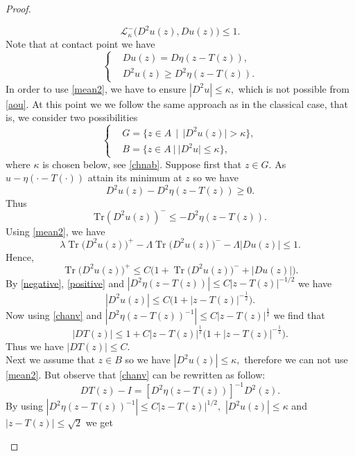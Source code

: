 \documentclass{amsart}
\theoremstyle{plain}
\numberwithin{equation}{section}
\begin{document}
\begin{proof}
\begin{enumerate}
\begin{equation}\label{mean2}
 \mathcal{L}_{\kappa}^{-}\big(D^{2}u(z),Du(z)\big)\leq 1. 
\end{equation}
Note that at contact point we have
\begin{equation}\label{aou}
\left\{
\begin{aligned}
&Du(z)=D\eta(z-T(z)),\\
&D^{2}u(z)\geq D^{2}\eta(z-T(z)).
\end{aligned}
\right.
\end{equation}
In order to use \eqref{mean2}, we have to ensure $|D^{2}u|\leq \kappa,$ which is not possible from \eqref{aou}. At this point we we follow the same approach as in the classical case, that is, we consider two possibilities 
\[
\left\{
\begin{aligned}
&G=\{z\in A~~|~~|D^{2}u(z)|>\kappa\},\\
&B=\{z\in A~|~|D^{2}u|\leq \kappa\},
\end{aligned}
\right.
\]
where $\kappa$ is chosen below, see \eqref{chnab}.  Suppose first that $z\in G.$ As $u-\eta(\cdot-T(\cdot))$ attain its minimum at $z$ so we have 
\[D^{2}u(z)-D^{2}\eta(z-T(z))\ge0.\]
Thus 
\begin{equation}\label{negative}
 \text{Tr}(D^{2}u(z))^{-}\leq -D^{2}\eta(z-T(z)).   
\end{equation}
Using \eqref{mean2}, we have 
\[\lambda\operatorname{Tr}\bigl(D^{2}u(z)\bigr)^{+}-\Lambda\operatorname{Tr}\bigl(D^{2}u(z)\bigr)^{-}-\Lambda|Du(z)|\le1.\]
Hence,
\begin{equation}\label{positive}
\operatorname{Tr}\bigl(D^{2}u(z)\bigr)^{+}\leq C\big(1+\operatorname{Tr}\bigl(D^{2}u(z)\bigr)^{-}+|Du(z)|\big).  \end{equation}
By \eqref{negative}, \eqref{positive} and $|D^{2}\eta(z-T(z))|\leq C|z-T(z)|^{-1/2}$ we have 
\begin{equation*}
|D^{2}u(z)|\leq C\big(1+|z-T(z)|^{-\frac{1}{2}}\big).
\end{equation*}
Now using \eqref{chanv} and $|D^{2}\eta(z-T(z))^{-1}|\leq C|z-T(z)|^{\frac{1}{2}}$ we find that 
\[|DT(z)|\leq 1+C|z-T(z)|^{\frac{1}{2}}\big(1+|z-T(z)|^{-\frac{1}{2}}\big).\]
Thus we have $|DT(z)|\leq C.$\\
Next we assume that $z\in B$ so we have $|D^{2}u(z)|\leq\kappa,$ therefore we can not use \eqref{mean2}. But observe that \eqref{chanv} can be rewritten as follow:
\[DT(z)-I=[D^{2}\eta(z-T(z))]^{-1}D^{2}(z).\]
By using $|D^{2}\eta(z-T(z))^{-1}|\leq C|z-T(z)|^{1/2},$  $|D^{2}u(z)|\leq\kappa$ and $|z-T(z)|\leq \sqrt{2}$ we get

\end{enumerate}
\end{proof}
\end{document}
